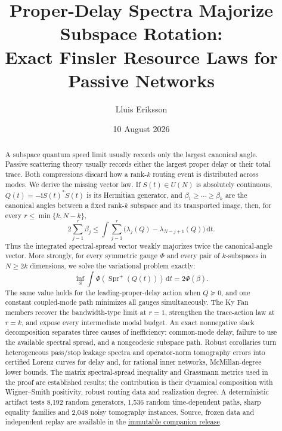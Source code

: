 \documentclass[11pt]{article}
\title{Proper-Delay Spectra Majorize Subspace Rotation:\\
Exact Finsler Resource Laws for Passive Networks}
\author{Lluis Eriksson}
\date{10 August 2026}
\theoremstyle{definition}
\theoremstyle{remark}
\newcommand{\dd}{\mathrm d}
\newcommand{\Spr}{\operatorname{Spr}^{+}}
\begin{document}
\maketitle

\begin{abstract}
A subspace quantum speed limit usually records only the largest canonical
angle.  Passive scattering theory usually records either the largest proper
delay or their total trace.  Both compressions discard how a rank-$k$ routing
event is distributed across modes.  We derive the missing vector law.  If
$S(t)\in U(N)$ is absolutely continuous,
$Q(t)=-\mathrm iS(t)^*\dot S(t)$ is its Hermitian generator, and
$\beta_1\geq\cdots\geq\beta_k$ are the canonical angles between a fixed
rank-$k$ subspace and its transported image, then, for every
$r\leq\min\{k,N-k\}$,
\[
 2\sum_{j=1}^r\beta_j
 \leq \int\sum_{j=1}^r
 \bigl(\lambda_j(Q)-\lambda_{N-j+1}(Q)\bigr)\,\dd t .
\]
Thus the integrated spectral-spread vector weakly majorizes twice the
canonical-angle vector.  More strongly, for every symmetric gauge $\Phi$ and
every pair of $k$-subspaces in $N\geq2k$ dimensions, we solve the variational
problem exactly:
\[
 \inf_S\int\Phi(\Spr(Q(t)))\,\dd t=2\Phi(\beta).
\]
The same value holds for the leading-proper-delay action when $Q\succeq0$,
and one constant coupled-mode path minimizes all gauges simultaneously.
The Ky Fan members recover the bandwidth-type limit at $r=1$, strengthen the
trace-action law at $r=k$, and expose every intermediate modal budget.  An exact
nonnegative slack decomposition separates three causes of inefficiency:
common-mode delay, failure to use the available spectral spread, and a
nongeodesic subspace path.  Robust corollaries turn heterogeneous pass/stop
leakage spectra and operator-norm tomography errors into certified Lorenz
curves for delay and, for rational inner networks, McMillan-degree lower
bounds.  The matrix spectral-spread inequality and Grassmann metrics used in
the proof are established results; the contribution is their dynamical
composition with Wigner--Smith positivity, robust routing data and realization
degree.  A deterministic artifact tests 8,192 random generators, 1,536 random
time-dependent paths, sharp equality families and 2,048 noisy tomography
instances.  Source, frozen data and independent replay are available in the
\href{https://github.com/lluiseriksson/finite-sample-spectral-certificates/releases/tag/v1.5-exact-finsler-speed-limits}{immutable companion release}.
\end{abstract}
\end{document}
